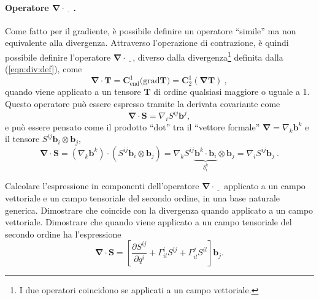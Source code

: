 \paragraph{Operatore $\bm{\nabla}\cdot \underline{\hspace{8pt}}\ $.}
Come fatto per il gradiente, è possibile definire un operatore ``simile'' ma non equivalente alla divergenza.
Attraverso l'operazione di contrazione, è quindi possibile definire l'operatore $\bm{\nabla} \cdot \underline{\hspace{8pt}}$, diverso dalla divergenza\footnote{I due operatori coincidono se applicati a un campo vettoriale.} definita dalla (\ref{eqn:div:def}), come
\begin{equation}
 \bm{\nabla} \cdot \bm{T} = \bm{C}^{1}_{\text{end}} \big( \text{grad} \bm{T} \big)  =
    \bm{C}^1_2 (\bm{\nabla} \bm{T}) \ ,
\end{equation}
quando viene applicato a un tensore $\bm{T}$ di ordine qualsiasi maggiore o uguale a 1.
Questo operatore può essere espresso tramite la derivata covariante come
\begin{equation}
 \bm{\nabla} \cdot \bm{S} = \nabla_i S^{ij} \bm{b}^j ,
\end{equation}
e può essere pensato come il prodotto ``dot'' tra il ``vettore formale'' $\bm{\nabla} = \nabla_k \bm{b}^k$ e il tensore $S^{ij} \bm{b}_i \otimes \bm{b}_j$,
\begin{equation}
      \bm{\nabla} \cdot \bm{S} = (\nabla_k \bm{b}^k) \cdot ( S^{ij} \bm{b}_i \otimes \bm{b}_j ) = \nabla_k S^{ij} \underbrace{\bm{b}^k \cdot \bm{b}_i}_{\delta^k_i} \otimes \bm{b}_j  = 
     \nabla_i S^{ij} \bm{b}_j \ . 
\end{equation}
%
\begin{exercise}
Calcolare l'espressione in componenti dell'operatore $\bm{\nabla} \cdot \underline{\hspace{8pt}}$ applicato a un campo vettoriale e un campo tensoriale del secondo ordine, in una base naturale generica. Dimostrare che coincide con la divergenza quando applicato a un campo vettoriale. Dimostrare che quando viene applicato a un campo tensoriale del secondo ordine ha l'espressione 
 \begin{equation}
  \bm{\nabla} \cdot \bm{S} = \left[ \dfrac{\partial S^{ij}}{\partial q^i} + \Gamma_{il}^i S^{lj} + \Gamma_{il}^j S^{il} \right] \bm{b}_j .
 \end{equation}
\end{exercise}

